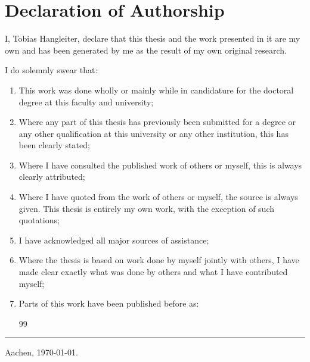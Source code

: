 \chapter{Declaration of Authorship}\label{ch:declaration-of-authorship}
I, Tobias Hangleiter, declare that this thesis and the work presented in it are my own and has been generated by me as the result of my own original research.

I do solemnly swear that:
\begin{enumerate}
    \item This work was done wholly or mainly while in candidature for the doctoral degree at this faculty and university;
    \item Where any part of this thesis has previously been submitted for a degree or any other qualification at this university or any other institution, this has been clearly stated;
    \item Where I have consulted the published work of others or myself, this is always clearly attributed;
    \item Where I have quoted from the work of others or myself, the source is always given.
          This thesis is entirely my own work, with the exception of such quotations;
    \item I have acknowledged all major sources of assistance;
    \item Where the thesis is based on work done by myself jointly with others, I have made clear exactly what was done by others and what I have contributed myself;
    \item Parts of this work have been published before as: \begin{refsection}[thesispubs]
        \small
        \nocite{*} %
        { %
            \expandafter\def\csname blx@maxbibnames\endcsname{99}%
            \printbibliography[heading=none]
        }
    \end{refsection}
\end{enumerate}

\vspace{3cm}
\rule{9cm}{0.1mm}

Aachen, \today.